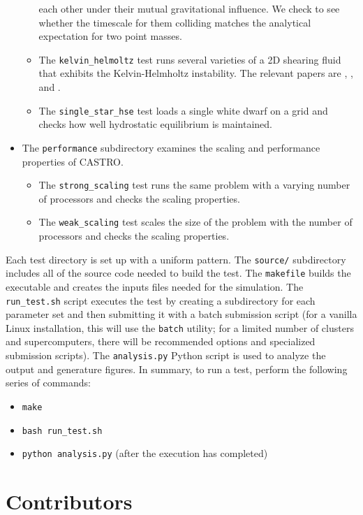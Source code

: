 \documentclass[12pt]{book}
\begin{document}
\begin{itemize}
\begin{itemize}
each other under their mutual gravitational influence. We check to see whether the timescale for them
colliding matches the analytical expectation for two point masses.
    \item The \texttt{kelvin\_helmoltz} test runs several varieties of a 2D shearing fluid that exhibits the 
Kelvin-Helmholtz instability. The relevant papers are \cite{robertson:2010}, \cite{arepo}, and \cite{mcnally:2012}.
    \item The \texttt{single\_star\_hse} test loads a single white dwarf on a grid and checks how well 
hydrostatic equilibrium is maintained.
  \end{itemize}
  \item The \texttt{performance} subdirectory examines the scaling and performance properties of CASTRO.
  \begin{itemize}
    \item The \texttt{strong\_scaling} test runs the same problem with a varying number of processors and 
checks the scaling properties.
    \item The \texttt{weak\_scaling} test scales the size of the problem with the number of processors and
checks the scaling properties.
  \end{itemize}
\end{itemize}

Each test directory is set up with a uniform pattern. The \texttt{source/} subdirectory includes all of the source code
needed to build the test. The \texttt{makefile} builds the executable and creates
the inputs files needed for the simulation. The \texttt{run\_test.sh} script executes the test by creating a subdirectory
for each parameter set and then submitting it with a batch submission script (for a vanilla Linux installation,
this will use the \texttt{batch} utility; for a limited number of clusters and supercomputers, 
there will be recommended options and specialized submission scripts). The \texttt{analysis.py} Python script
is used to analyze the output and generature figures. In summary, to run a test, perform the following series of commands:
\begin{itemize}
  \item \texttt{make}
  \item \texttt{bash run\_test.sh}
  \item \texttt{python analysis.py} (after the execution has completed)
\end{itemize}

\chapter{Contributors}
\end{document}
